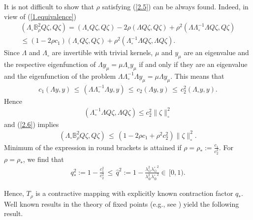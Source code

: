\documentclass[amstex,amstext,amsfonts,epsf,12pt] {amsart}
\newcommand\be{\begin{eqnarray*}}
\newcommand\ee{\end{eqnarray*}}
\newcommand\ben{\begin{eqnarray}}
\newcommand\een{\end{eqnarray}}
\def\be{\begin{eqnarray*}}
\def\ee{\end{eqnarray*}}
\def\ben{\begin{eqnarray}}
\def\een{\end{eqnarray}}
\def\lamin{{\lambda}_\ominus}
\def\lamax{{\lambda}_\oplus}
\def\laomin{{\lambda}^\circ_\ominus}
\def\laomax{{\lambda}^\circ_\oplus}
\begin{document}
It is not difficult to show that  $\rho$ satisfying  (\ref{2.5}) can be always found.
Indeed, in view of  (\ref{1.equivalence})
\begin{multline}
\label{2.6}
(\Lambda_\circ{\mathbb B}^2_\rho Q\zeta,Q\zeta)=
(\Lambda_\circ Q\zeta,Q\zeta)-2\rho(\Lambda Q\zeta,Q\zeta)+\rho^2(\Lambda\Lambda^{-1}_\circ\Lambda Q\zeta,Q\zeta)\\
\leq  (1-2\rho c_1)(\Lambda_\circ Q\zeta,Q\zeta)+\rho^2
(\Lambda^{-1}_\circ\Lambda Q\zeta, \Lambda Q\zeta).
\end{multline}
Since $\Lambda$ and $\Lambda_\circ$ are invertible with
 trivial kernels,
 $\mu$ and $y_\mu$ are an eigenvalue and the respective
eigenfunction of $\Lambda y_\mu=\mu \Lambda_\circ y_\mu$
if and only if
they are an eigenvalue and the eigenfunction
of the problem 
$\Lambda\Lambda^{-1}_\circ\Lambda y_\mu=\mu \Lambda y_\mu$.
This means that
\be
c_1(\Lambda y,y)\,\leq\,(\Lambda\Lambda^{-1}_\circ\Lambda y,y)\, \leq\,
c_2(\Lambda y,y)\,\leq\, c^2_2(\Lambda_\circ y,y).
\ee
Hence
\be
(\Lambda^{-1}_\circ\Lambda Q\zeta, \Lambda Q\zeta)\leq 
c^2_2 \|\zeta\|^2_\circ
\ee
and (\ref{2.6}) implies
\ben
\label{2.7}
(\Lambda_\circ{\mathbb B}^2_\rho Q\zeta,Q\zeta)\,\leq\, 
\left(1-2\rho c_1 +\rho^2 c^2_2
\right)\|\zeta\|^2_\circ.
\een
Minimum of the expression in round brackets
is attained if $\rho=\rho_*:=  \frac{c_1}{c^2_2}$.
For $\rho=\rho_*$, we find that
\ben
\label{2.8}
q^2_*:=1-\frac{c^2_1}{c^2_2}\,
\leq\, \hat q^2:=1-\frac{\lamin^2{\laomin\!}^2}
{\lamax^2{\laomax\!}^2}
\in \,[0,1).
\een







 Hence, $T_\rho$ is a contractive mapping with explicitly known contraction factor $q_*$.
Well known results in the theory of fixed points (e.g., see \cite{Zeidler})
yield the following result.
\end{document}
